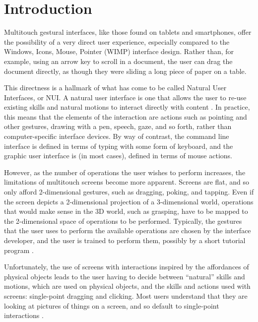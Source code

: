 \documentclass[]{article}
\title{}
\author{}
\begin{document}
\maketitle

\begin{abstract}

\end{abstract}

\section{Introduction}

Multitouch gestural interfaces, like those found on tablets and smartphones, offer the possibility of a very direct user experience, especially compared to the Windows, Icons, Mouse, Pointer (WIMP) interface design. 
Rather than, for example, using an arrow key to scroll in a document, the user can drag the document directly, as though they were sliding a long piece of paper on a table. 

This directness is a hallmark of what has come to be called Natural User Interfaces, or NUI. 
A natural user interface is one that allows the user to re-use existing skills and natural motions to interact directly with content \cite{blakeNUIWin}. 
In practice, this means that the elements of the interaction are actions such as pointing and other gestures, drawing with a pen, speech, gaze, and so forth, rather than computer-specific interface devices. 
By way of contrast, the command line interface is defined in terms of typing with some form of keyboard, and the graphic user interface is (in most cases), defined in terms of mouse actions. 

However, as the number of operations the user wishes to perform increases, the limitations of multitouch screens become more apparent. 
Screens are flat, and so only afford 2-dimensional gestures, such as dragging, poking, and tapping. 
Even if the screen depicts a 2-dimensional projection of a 3-dimensional world, operations that would make sense in the 3D world, such as grasping, have to be mapped to the 2-dimensional space of operations to be performed. 
Typically, the gestures that the user uses to perform the available operations are chosen by the interface developer, and the user is trained to perform them, possibly by a short tutorial program \cite{wobbrock2009user, vanacken2008ghosts, freeman2009shadowguides}. 

Unfortunately, the use of screens with interactions inspired by the affordances of physical objects leads to the user having to decide between ``natural'' skills and motions, which are used on physical objects, and the skills and actions used with screens: single-point dragging and clicking. 
Most users understand that they are looking at pictures of things on a screen, and so default to single-point interactions \cite{vanacken2008ghosts}.
\end{document}
